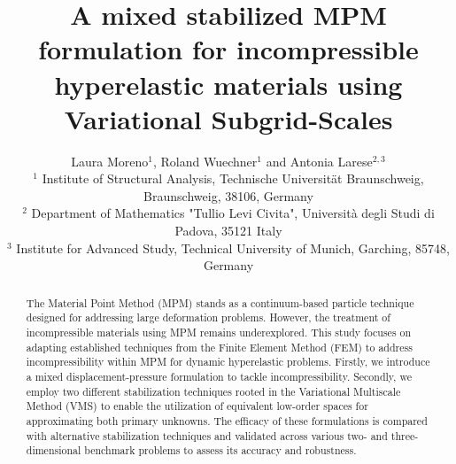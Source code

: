 \documentclass[11pt,english]{article}
\title{A mixed stabilized MPM formulation for incompressible hyperelastic materials using Variational Subgrid-Scales}
\begin{document}
    
    \author{Laura Moreno$^{1}$, Roland Wuechner$^{1}$ and Antonia Larese$^{2,3}$ \\
    {\footnotesize{}{}$^{1}$ Institute of Structural Analysis, Technische Universit\"at Braunschweig, %
    Braunschweig, 38106, Germany}\\
    {\footnotesize{}{}$^{2}$ Department of Mathematics "Tullio Levi Civita", Università degli Studi di Padova, 35121 Italy}\\
    {\footnotesize{}{}$^{3}$ Institute for Advanced Study, Technical University of Munich, %
    Garching, 85748, Germany}}
     
     
    \maketitle

    \linenumbers
    
    \begin{abstract}
	The Material Point Method (MPM) stands as a continuum-based particle technique designed for addressing large deformation problems. 
    However, the treatment of incompressible materials using MPM remains underexplored. This study focuses on adapting established techniques from the Finite Element Method (FEM) to address incompressibility within MPM for dynamic hyperelastic problems. Firstly, we introduce a mixed displacement-pressure formulation to tackle incompressibility. Secondly, we employ two different stabilization techniques rooted in the Variational Multiscale Method (VMS) to enable the utilization of equivalent low-order spaces for approximating both primary unknowns. The efficacy of these formulations is  compared with alternative stabilization techniques and validated across various two- and three-dimensional benchmark problems to assess its accuracy and robustness. 
    \end{abstract}

\maketitle
{}


%
%
\end{document}
